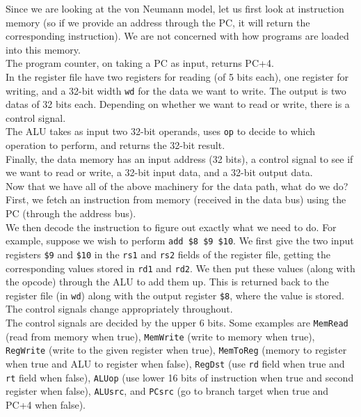 \documentclass{article}
\begin{document}
		Since we are looking at the von Neumann model, let us first look at instruction memory (so if we provide an address through the PC, it will return the corresponding instruction). We are not concerned with how programs are loaded into this memory.\\
		The program counter, on taking a PC as input, returns PC+4.\\
		In the register file have two registers for reading (of 5 bits each), one register for writing, and a 32-bit width \texttt{wd} for the data we want to write. The output is two datas of 32 bits each. Depending on whether we want to read or write, there is a control signal.\\
		The ALU takes as input two 32-bit operands, uses \texttt{op} to decide to which operation to perform, and returns the 32-bit result.\\
		Finally, the data memory has an input address (32 bits), a control signal to see if we want to read or write, a 32-bit input data, and a 32-bit output data.\\

		Now that we have all of the above machinery for the data path, what do we do?\\
		First, we fetch an instruction from memory (received in the data bus) using the PC (through the address bus).\\
		We then decode the instruction to figure out exactly what we need to do. For example, suppose we wish to perform \texttt{add \$8 \$9 \$10}. We first give the two input registers \texttt{\$9} and \texttt{\$10} in the \texttt{rs1} and \texttt{rs2} fields of the register file, getting the corresponding values stored in \texttt{rd1} and \texttt{rd2}. We then put these values (along with the opcode) through the ALU to add them up. This is returned back to the register file (in \texttt{wd}) along with the output register \texttt{\$8}, where the value is stored. The control signals change appropriately throughout.\\

		The control signals are decided by the upper 6 bits. Some examples are \texttt{MemRead} (read from memory when true), \texttt{MemWrite} (write to memory when true), \texttt{RegWrite} (write to the given register when true), \texttt{MemToReg} (memory to register when true and ALU to register when false), \texttt{RegDst} (use \texttt{rd} field when true and \texttt{rt} field when false), \texttt{ALUop} (use lower 16 bits of instruction when true and second register when false), \texttt{ALUsrc}, and \texttt{PCsrc} (go to branch target when true and PC+4 when false).\\
\end{document}
